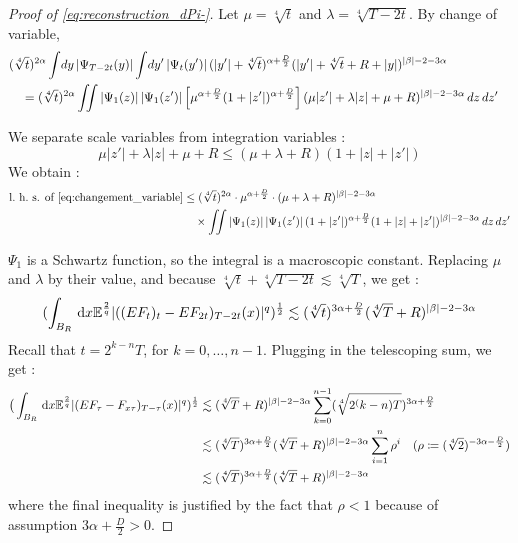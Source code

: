 \begin{proof}[Proof of \eqref{eq:reconstruction_dPi-}]
Let $\mu = \sqrt[4]{t}$ and $\lambda = \sqrt[4]{T-2t}$.
By change of variable, 
\begin{align}
\lefteqn{ (\sqrt[4]{t})^{2\alpha} \int \! dy \, |\Psi_{T-2t}(y)| \int \! dy' \, |\Psi_t(y')| \, (|y'| + \sqrt[4]{t})^{\alpha + \frac{D}{2}} (|y'| + \sqrt[4]{t} + R + |y|)^{|\beta| - 2 - 3\alpha} } \nonumber \\
& \quad = (\sqrt[4]{t})^{2\alpha} \iint |\Psi_1(z)| \, |\Psi_1(z')| \left[ \mu^{\alpha + \frac{D}{2}} (1 + |z'|)^{\alpha + \frac{D}{2}} \right] (\mu|z'| + \lambda|z| + \mu + R)^{|\beta| - 2 - 3\alpha} \, dz \, dz' \label{eq:changement_variable}
\end{align}

We separate scale variables from integration variables :
\begin{equation}
\mu|z'| + \lambda|z| + \mu + R \le (\mu + \lambda + R)(1 + |z| + |z'|)
\end{equation}
We obtain :
\begin{align}
\text{l.~h.~s. of \eqref{eq:changement_variable}} 
& \le (\sqrt[4]{t})^{2\alpha} \cdot \mu^{\alpha + \frac{D}{2}} \cdot (\mu + \lambda + R)^{|\beta| - 2 - 3\alpha} \nonumber \\
& \quad \times \iint |\Psi_1(z)| \, |\Psi_1(z')| \, (1 + |z'|)^{\alpha + \frac{D}{2}} (1 + |z| + |z'|)^{|\beta| - 2 - 3\alpha} \, dz \, dz' \label{eq:separation_blocs}
\end{align}

$\Psi_1$ is a Schwartz function, so the integral is a macroscopic constant. Replacing $\mu$ and $\lambda$ by their value, and because $\sqrt[4]{t} + \sqrt[4]{T-2t} \lesssim \sqrt[4]{T}$, we get :
\begin{equation}
(\int_{B_R} \,\mathrm{d} x \mathbb{E}^\frac{2}{q} \lvert((EF_t)_t - EF_{2t})_{T-2t}(x)\rvert^q)^\frac{1}{2} 
 \lesssim (\sqrt[4]{t})^{3\alpha + \frac{D}{2}} (\sqrt[4]{T} + R)^{|\beta| - 2 - 3\alpha}
\end{equation}
Recall that $t=2^{k-n}T$, for $k=0,\dots,n-1$. Plugging in the telescoping sum, we get :
\begin{align*}
    \big(\int_{B_R} \,\mathrm{d} x \mathbb{E}^{\frac{2}{q}} \lvert(EF_\tau - F_{x\tau})_{T-\tau}(x)\rvert^q)^{\frac{1}{2}} &\lesssim (\sqrt[4]{T} + R)^{|\beta| - 2 - 3\alpha} \sum_{k=0}^{n-1} (\sqrt[4]{2^(k-n)T})^{3\alpha + \frac{D}{2}}\\
    &\lesssim (\sqrt[4]{T})^{3\alpha + \frac{D}{2}}(\sqrt[4]{T} + R)^{|\beta| - 2 - 3\alpha} \sum_{i=1}^{n} \rho^i \quad (\rho \coloneq (\sqrt[4]{2})^{-3\alpha -\frac{D}{2}})\\
    &\lesssim (\sqrt[4]{T})^{3\alpha + \frac{D}{2}}(\sqrt[4]{T} + R)^{|\beta| - 2 - 3\alpha} 
\end{align*}
where the final inequality is justified by the fact that $\rho<1$ because of assumption $3\alpha+\frac{D}{2}>0$.


\end{proof}
